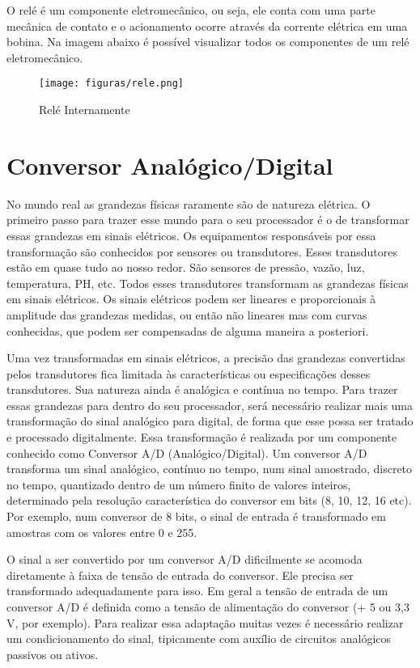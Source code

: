 O relé é um componente eletromecânico, ou seja, ele conta com uma parte mecânica de contato e o acionamento ocorre através da corrente elétrica em uma bobina. Na imagem abaixo é possível visualizar todos os componentes de um relé eletromecânico\cite{braga2012}.

\begin{figure}[H]
	\centering
	\texttt{[image: figuras/rele.png]}
	\caption{Relé Internamente} \label{rele}
\end{figure}

\section{Conversor Analógico/Digital}

No mundo real as grandezas físicas raramente são de natureza elétrica. O primeiro passo para trazer esse mundo para o seu processador é o de transformar essas grandezas em sinais elétricos. Os equipamentos responsáveis por essa transformação são conhecidos por sensores ou transdutores. Esses transdutores estão em quase tudo ao nosso redor. São sensores de pressão, vazão, luz, temperatura, PH, etc. Todos esses transdutores transformam as grandezas físicas em sinais elétricos. Os sinais elétricos podem ser lineares e proporcionais à amplitude das grandezas medidas, ou então não lineares mas com curvas conhecidas, que podem ser compensadas de alguma maneira a posteriori\cite{braga2013}.

Uma vez transformadas em sinais elétricos, a precisão das grandezas convertidas pelos transdutores fica limitada às características ou especificações desses transdutores. Sua natureza ainda é analógica e contínua no tempo. Para trazer essas grandezas para dentro do seu processador, será necessário realizar mais uma transformação do sinal analógico para digital, de forma que esse possa ser tratado e processado digitalmente. Essa transformação é realizada por um componente conhecido como Conversor A/D (Analógico/Digital)\cite{braga2013}.
Um conversor A/D transforma um sinal analógico, contínuo no tempo, num sinal amostrado, discreto no tempo, quantizado dentro de um número finito de valores inteiros, determinado pela resolução característica do conversor em bits (8, 10, 12, 16 etc). Por exemplo, num conversor de 8 bits, o sinal de entrada é transformado em amostras com os valores entre 0 e 255\cite{braga2013}.

O sinal a ser convertido por um conversor A/D dificilmente se acomoda diretamente à faixa de tensão de entrada do conversor. Ele precisa ser transformado adequadamente para isso. Em geral a tensão de entrada de um conversor A/D é definida como a tensão de alimentação do conversor (+ 5 ou 3,3 V, por exemplo). Para realizar essa adaptação muitas vezes é necessário realizar um condicionamento do sinal, tipicamente com auxílio de circuitos analógicos passivos ou ativos\cite{braga2013}.

